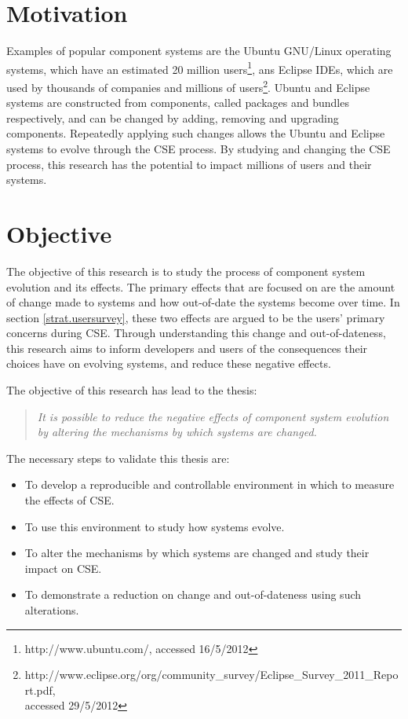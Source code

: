 \section{Motivation}
Examples of popular component systems are the Ubuntu GNU/Linux operating systems, which have an estimated 20 million users\footnote{http://www.ubuntu.com/, accessed 16/5/2012},
ans Eclipse IDEs, which are used by thousands of companies and millions of users\footnote{http://www.eclipse.org/org/community\_survey/Eclipse\_Survey\_2011\_Report.pdf, \\accessed 29/5/2012}.
Ubuntu and Eclipse systems are constructed from components, called packages and bundles respectively, 
and can be changed by adding, removing and upgrading components.
Repeatedly applying such changes allows the Ubuntu and Eclipse systems to evolve through the CSE process.
By studying and changing the CSE process,
this research has the potential to impact millions of users and their systems.

\section{Objective}
The objective of this research is to study the process of component system evolution and its effects.
The primary effects that are focused on are the amount of change made to systems and how out-of-date the systems become over time.
In section \ref{strat.usersurvey}, these two effects are argued to be the users' primary concerns during CSE.
Through understanding this change and out-of-dateness,
this research aims to inform developers and users of the consequences their choices have on evolving systems,
and reduce these negative effects.

The objective of this research has lead to the thesis:
\begin{quote}
\textit{It is possible to reduce the negative effects of component system evolution by altering the mechanisms by which systems are changed.} 
\end{quote}

The necessary steps to validate this thesis are:
\begin{itemize}
  \item To develop a reproducible and controllable environment in which to measure the effects of CSE.
  \item To use this environment to study how systems evolve.
  \item To alter the mechanisms by which systems are changed and study their impact on CSE.
  \item To demonstrate a reduction on change and out-of-dateness using such alterations.
\end{itemize}

